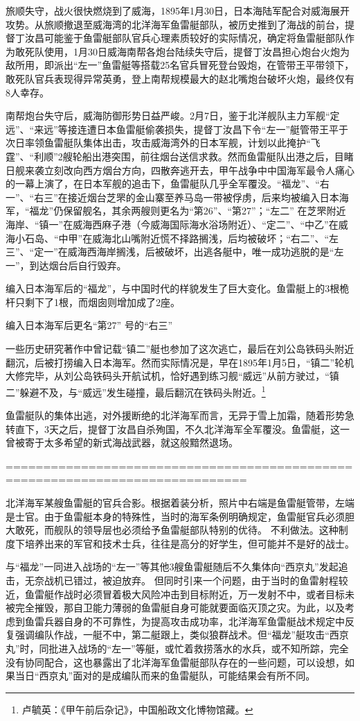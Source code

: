 \documentclass[12pt,UTF8]{ctexbook}
\begin{document}
旅顺失守，战火很快燃烧到了威海，1895年1月30日，日本海陆军配合对威海展开攻势。从旅顺撤退至威海湾的北洋海军鱼雷艇部队，被历史推到了海战的前台，提督丁汝昌可能鉴于鱼雷艇部队官兵心理素质较好的实际情况，确定将鱼雷艇部队作为敢死队使用，1月30日威海南帮各炮台陆续失守后，提督丁汝昌担心炮台火炮为敌所用，即派出“左一”鱼雷艇等搭载25名官兵冒死登台毁炮，在管带王平带领下，敢死队官兵表现得异常英勇，登上南帮规模最大的赵北嘴炮台破坏火炮，最终仅有8人幸存。

南帮炮台失守后，威海防御形势日益严峻。2月7日，鉴于北洋舰队主力军舰“定远”、“来远”等接连遭日本鱼雷艇偷袭损失，提督丁汝昌下令“左一”艇管带王平于次日率领鱼雷艇队集体出击，攻击威海湾外的日本军舰，计划以此掩护“飞霆”、“利顺”2艘轮船出港突围，前往烟台送信求救。然而鱼雷艇队出港之后，目睹日舰来袭立刻改向西方烟台方向，四散奔逃开去，甲午战争中中国海军最令人痛心的一幕上演了，在日本军舰的追击下，鱼雷艇队几乎全军覆没。“福龙”、“右一”、“右三”在接近烟台芝罘的金山寨至养马岛一带被俘虏，后来均被编入日本海军，“福龙”仍保留舰名，其余两艘则更名为“第26”、“第27”；“左二” 在芝罘附近海岸、“镇一”在威海西麻子港（今威海国际海水浴场附近）、“定二”、“中乙”在威海小石岛、“中甲”在威海北山嘴附近慌不择路搁浅，后均被破坏；“右二”、“左三”、“定一”在威海西海岸搁浅，后被破坏，出逃各艇中，唯一成功逃脱的是“左一”，到达烟台后自行毁弃。

编入日本海军后的“福龙”，与中国时代的样貌发生了巨大变化。鱼雷艇上的3根桅杆只剩下了1根，而烟囱则增加成了2座。

编入日本海军后更名“第27” 号的“右三”

一些历史研究著作中曾记载“镇二”艇也参加了这次逃亡，最后在刘公岛铁码头附近翻沉，后被打捞编入日本海军。然而实际情况是，早在1895年1月5日，“镇二”轮机大修完毕，从刘公岛铁码头开航试机，恰好遇到练习舰“威远”从前方驶过，“镇二”躲避不及，与“威远”发生碰撞，最后翻沉在铁码头附近。\footnote{卢毓英：《甲午前后杂记》，中国船政文化博物馆藏。}

鱼雷艇队的集体出逃，对外援断绝的北洋海军而言，无异于雪上加霜，随着形势急转直下，3天之后，提督丁汝昌自杀殉国，不久北洋海军全军覆没。鱼雷艇，这一曾被寄于太多希望的新式海战武器，就这般黯然退场。

==============================================================================

北洋海军某艘鱼雷艇的官兵合影。根据着装分析，照片中右端是鱼雷艇管带，左端是士官。由于鱼雷艇本身的特殊性，当时的海军条例明确规定，鱼雷艇官兵必须胆大敢死，而舰队的领导层也必须给予鱼雷艇部队特别的优待。
不利做法。这种制度下培养出来的军官和技术士兵，往往是高分的好学生，但可能并不是好的战士。

与“福龙”一同进入战场的“左一”等其他3艘鱼雷艇随后不久集体向“西京丸”发起追击，无奈战机已错过，被迫放弃。
但同时引来一个问题，由于当时的鱼雷射程较近，鱼雷艇作战时必须冒着极大风险冲击到目标附近，万一发射不中，或者目标未被完全摧毁，那自卫能力薄弱的鱼雷艇自身可能就要面临灭顶之灾。为此，以及考虑到鱼雷兵器自身的不可靠性，为提高攻击成功率，北洋海军鱼雷艇战术规定中反复强调编队作战，一艇不中，第二艇跟上，类似狼群战术。但“福龙”艇攻击“西京丸”时，同批进入战场的“左一”等艇，或忙着救捞落水的水兵，或不知所踪，完全没有协同配合，这也暴露出了北洋海军鱼雷艇部队存在的一些问题，可以设想，如果当日“西京丸”面对的是成编队而来的鱼雷艇队，可能结果会有所不同。
\end{document}
